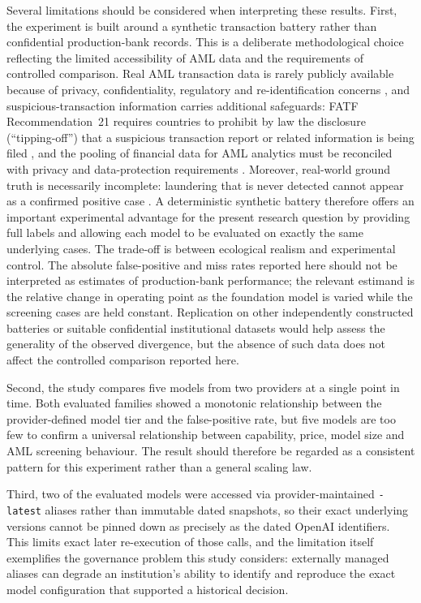 \documentclass[pdflatex,sn-basic,Numbered]{sn-jnl}
\begin{document}
Several limitations should be considered when interpreting these results. First, the experiment is built around a synthetic transaction battery rather than confidential production-bank records. This is a deliberate methodological choice reflecting the limited accessibility of AML data and the requirements of controlled comparison. Real AML transaction data is rarely publicly available because of privacy, confidentiality, regulatory and re-identification concerns \cite{jensen}, and suspicious-transaction information carries additional safeguards: FATF Recommendation~21 requires countries to prohibit by law the disclosure (``tipping-off'') that a suspicious transaction report or related information is being filed \cite{fatf-recs}, and the pooling of financial data for AML analytics must be reconciled with privacy and data-protection requirements \cite{fatf-datapooling}. Moreover, real-world ground truth is necessarily incomplete: laundering that is never detected cannot appear as a confirmed positive case \cite{altman}. A deterministic synthetic battery therefore offers an important experimental advantage for the present research question by providing full labels and allowing each model to be evaluated on exactly the same underlying cases. The trade-off is between ecological realism and experimental control. The absolute false-positive and miss rates reported here should not be interpreted as estimates of production-bank performance; the relevant estimand is the relative change in operating point as the foundation model is varied while the screening cases are held constant. Replication on other independently constructed batteries or suitable confidential institutional datasets would help assess the generality of the observed divergence, but the absence of such data does not affect the controlled comparison reported here.

Second, the study compares five models from two providers at a single point in time. Both evaluated families showed a monotonic relationship between the provider-defined model tier and the false-positive rate, but five models are too few to confirm a universal relationship between capability, price, model size and AML screening behaviour. The result should therefore be regarded as a consistent pattern for this experiment rather than a general scaling law.

Third, two of the evaluated models were accessed via provider-maintained \texttt{-latest} aliases rather than immutable dated snapshots, so their exact underlying versions cannot be pinned down as precisely as the dated OpenAI identifiers. This limits exact later re-execution of those calls, and the limitation itself exemplifies the governance problem this study considers: externally managed aliases can degrade an institution's ability to identify and reproduce the exact model configuration that supported a historical decision.
\end{document}
